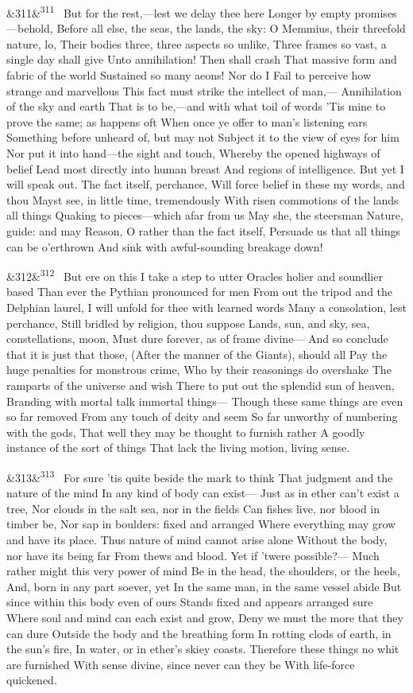 \documentclass[12pt]{article}
\newcommand{\para}[1][]{\par\noindent\ifx&#1&\else\textsuperscript{\footnotesize #1}~\fi}
\begin{document}
\para[311] But for the rest,---lest we delay thee here Longer by empty promises---behold, Before all else, the seas, the lands, the sky: O Memmius, their threefold nature, lo, Their bodies three, three aspects so unlike, Three frames so vast, a single day shall give Unto annihilation! Then shall crash That massive form and fabric of the world Sustained so many aeons! Nor do I Fail to perceive how strange and marvellous This fact must strike the intellect of man,--- Annihilation of the sky and earth That is to be,---and with what toil of words 'Tis mine to prove the same; as happens oft When once ye offer to man's listening ears Something before unheard of, but may not Subject it to the view of eyes for him Nor put it into hand---the sight and touch, Whereby the opened highways of belief Lead most directly into human breast And regions of intelligence. But yet I will speak out. The fact itself, perchance, Will force belief in these my words, and thou Mayst see, in little time, tremendously With risen commotions of the lands all things Quaking to pieces---which afar from us May she, the steersman Nature, guide: and may Reason, O rather than the fact itself, Persuade us that all things can be o'erthrown And sink with awful-sounding breakage down!

\para[312] But ere on this I take a step to utter Oracles holier and soundlier based Than ever the Pythian pronounced for men From out the tripod and the Delphian laurel, I will unfold for thee with learned words Many a consolation, lest perchance, Still bridled by religion, thou suppose Lands, sun, and sky, sea, constellations, moon, Must dure forever, as of frame divine--- And so conclude that it is just that those, (After the manner of the Giants), should all Pay the huge penalties for monstrous crime, Who by their reasonings do overshake The ramparts of the universe and wish There to put out the splendid sun of heaven, Branding with mortal talk immortal things--- Though these same things are even so far removed From any touch of deity and seem So far unworthy of numbering with the gods, That well they may be thought to furnish rather A goodly instance of the sort of things That lack the living motion, living sense.

\para[313] For sure 'tis quite beside the mark to think That judgment and the nature of the mind In any kind of body can exist--- Just as in ether can't exist a tree, Nor clouds in the salt sea, nor in the fields Can fishes live, nor blood in timber be, Nor sap in boulders: fixed and arranged Where everything may grow and have its place. Thus nature of mind cannot arise alone Without the body, nor have its being far From thews and blood. Yet if 'twere possible?--- Much rather might this very power of mind Be in the head, the shoulders, or the heels, And, born in any part soever, yet In the same man, in the same vessel abide But since within this body even of ours Stands fixed and appears arranged sure Where soul and mind can each exist and grow, Deny we must the more that they can dure Outside the body and the breathing form In rotting clods of earth, in the sun's fire, In water, or in ether's skiey coasts. Therefore these things no whit are furnished With sense divine, since never can they be With life-force quickened.
\end{document}
